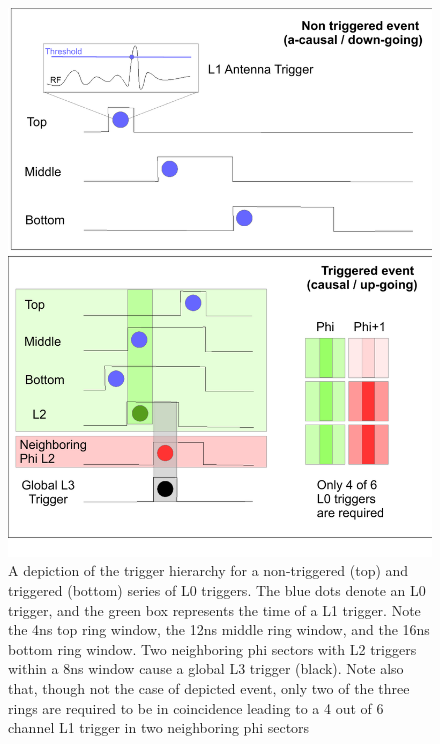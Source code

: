 \begin{figure}
	\centering
	\includegraphics[height=0.8\textheight]{figures/triggerHeirarchy}
	\caption{A depiction of the trigger hierarchy for a non-triggered (top) and triggered (bottom) series of L0 triggers.  The blue dots denote an L0 trigger, and the green box represents the time of a L1  trigger.  Note the 4ns top ring window, the 12ns middle ring window, and the 16ns bottom ring window.  Two neighboring phi sectors with L2 triggers within a 8ns window cause a global L3 trigger (black).  Note also that, though not the case of depicted event, only two of the three rings are required to be in coincidence leading to a 4 out of 6 channel L1 trigger in two neighboring phi sectors}
	\label{fig:trigPattern}
\end{figure}


